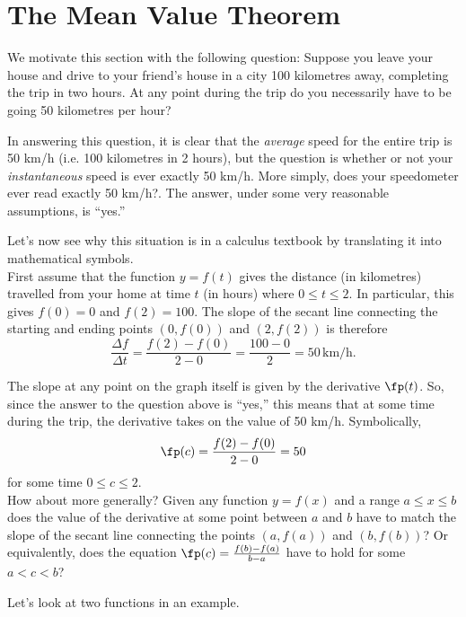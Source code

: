 \section{The Mean Value Theorem}\label{sec:mvt}

We motivate this section with the following question: Suppose you leave your house and drive to your friend's house in a city 100 kilometres away, completing the trip in two hours.  At any point during the trip do you necessarily have to be going 50 kilometres per hour?

In answering this question, it is clear that the \textit{average} speed for the entire trip is 50 km/h (i.e. 100 kilometres in 2 hours), but the question is whether or not your \textit{instantaneous} speed is ever exactly 50 km/h. More simply, does your speedometer ever read exactly 50 km/h?.  The answer, under some very reasonable assumptions, is ``yes.''

Let's now see why this situation is in a calculus textbook by translating it into mathematical symbols.\\

First assume that the function $y = f(t)$ gives the distance (in kilometres) travelled from your home at time $t$ (in hours) where $0\le t\le 2$.  In particular, this gives $f(0)=0$ and $f(2)=100$.  The slope of the secant line connecting the starting and ending points $(0,f(0))$ and $(2,f(2))$ is therefore 
\[
\frac{\Delta f}{\Delta t} = \frac{f(2)-f(0)}{2-0} = \frac{100-0}{2} = 50 \, \text{km/h}.
\]

The slope at any point on the graph itself is given by the derivative $\fp(t)$.  So, since the answer to the question above is ``yes,'' this means that at some time during the trip, the derivative takes on the value of 50 km/h.  Symbolically, 
\[
\fp(c) = \frac{f(2)-f(0)}{2-0} = 50
\]
for some time $0\le c \le 2.$\\

How about more generally?  Given any function $y=f(x)$ and a range $a\le x\le b$ does the value of the derivative at some point between $a$ and $b$ have to match the slope of the secant line connecting the points $(a,f(a))$ and $(b,f(b))$?  Or equivalently, does the equation 
$\fp(c) = \frac{f(b)-f(a)}{b-a}$ have to hold for some $a < c < b$?

Let's look at two functions in an example.\\

